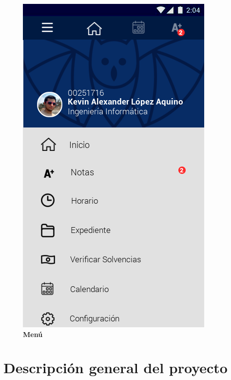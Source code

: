 \documentclass[12pt]{article}
\begin{document}
\begin{figure}[H]
	\caption{\textbf{Men\'u}}
	\includegraphics[scale=0.45]{img/5.png}
	\centering
\end{figure}


\section{Descripción general del proyecto}
\end{document}

